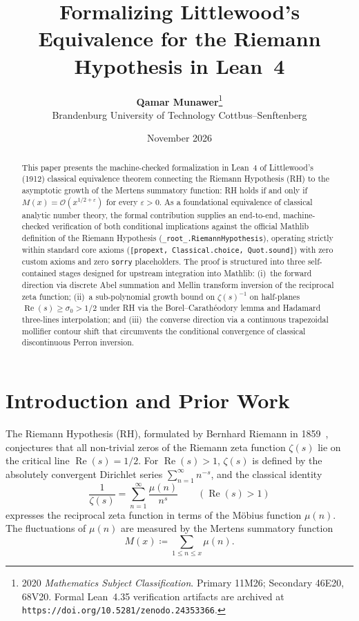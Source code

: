 \documentclass[11pt,a4paper]{article}
\title{\textbf{Formalizing Littlewood's Equivalence for the Riemann Hypothesis in Lean~4}}
\author{\textbf{Qamar Munawer}\thanks{2020 \emph{Mathematics Subject Classification}. Primary 11M26; Secondary 46E20, 68V20. Formal Lean~4.35 verification artifacts are archived at \texttt{https://doi.org/10.5281/zenodo.24353366}.}\\[0.3em]
\small Brandenburg University of Technology Cottbus--Senftenberg}
\date{November 2026}
\theoremstyle{definition}
\begin{document}
\linespread{1.15}\selectfont

\maketitle

\begin{abstract}
This paper presents the machine-checked formalization in Lean~4 of Littlewood's (1912) classical equivalence theorem connecting the Riemann Hypothesis (RH) to the asymptotic growth of the Mertens summatory function: RH holds if and only if $M(x) = \mathcal{O}(x^{1/2+\varepsilon})$ for every $\varepsilon > 0$. As a foundational equivalence of classical analytic number theory, the formal contribution supplies an end-to-end, machine-checked verification of both conditional implications against the official Mathlib definition of the Riemann Hypothesis (\texttt{\_root\_.RiemannHypothesis}), operating strictly within standard core axioms (\texttt{[propext, Classical.choice, Quot.sound]}) with zero custom axioms and zero \texttt{sorry} placeholders. The proof is structured into three self-contained stages designed for upstream integration into Mathlib: (i)~the forward direction via discrete Abel summation and Mellin transform inversion of the reciprocal zeta function; (ii)~a sub-polynomial growth bound on $\zeta(s)^{-1}$ on half-planes $\operatorname{Re}(s) \ge \sigma_0 > 1/2$ under RH via the Borel--Carath\'eodory lemma and Hadamard three-lines interpolation; and (iii)~the converse direction via a continuous trapezoidal mollifier contour shift that circumvents the conditional convergence of classical discontinuous Perron inversion.
\end{abstract}

\section{Introduction and Prior Work}
\label{sec:intro}

The Riemann Hypothesis (RH), formulated by Bernhard Riemann in 1859~\cite{Riemann1859}, conjectures that all non-trivial zeros of the Riemann zeta function $\zeta(s)$ lie on the critical line $\operatorname{Re}(s) = 1/2$. For $\operatorname{Re}(s) > 1$, $\zeta(s)$ is defined by the absolutely convergent Dirichlet series $\sum_{n=1}^\infty n^{-s}$, and the classical identity
\begin{equation}
\label{eq:zeta_inv_euler}
\frac{1}{\zeta(s)} = \sum_{n=1}^\infty \frac{\mu(n)}{n^s} \qquad (\operatorname{Re}(s) > 1)
\end{equation}
expresses the reciprocal zeta function in terms of the M\"obius function $\mu(n)$. The fluctuations of $\mu(n)$ are measured by the Mertens summatory function
\begin{equation}
\label{eq:mertens_def}
M(x) \coloneqq \sum_{1 \le n \le x} \mu(n).
\end{equation}
\end{document}
